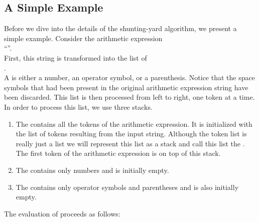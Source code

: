 \subsection{A Simple Example}
Before we dive into the details of the shunting-yard algorithm, we present a
simple example.  Consider the arithmetic expression 
\\[0.2cm]
\hspace*{1.3cm} 
``''. 
\\[0.2cm]
First, this string is transformed into the list of 
\\[0.2cm]
\hspace*{1.3cm}
.
\\[0.2cm]
A  is either a number, an operator symbol, or a parenthesis.
Notice that the space symbols that had been present in the original arithmetic expression string
have been discarded.  This list is then processed from left to right, one token
 at a time.  In order to process this list, we use three stacks.
\begin{enumerate}
\item The   contains all the tokens of the arithmetic expression.  It is
      initialized with the list of tokens resulting from the input string.
      Although the token list is really just a list we will represent this list as a stack and call
      this list the .
      The first token of the arithmetic expression is on top of this stack.
\item The   contains only numbers and is initially empty.
\item The  contains only operator symbols and parentheses and is also initially
      empty.
\end{enumerate}
The evaluation of  proceeds as follows:
